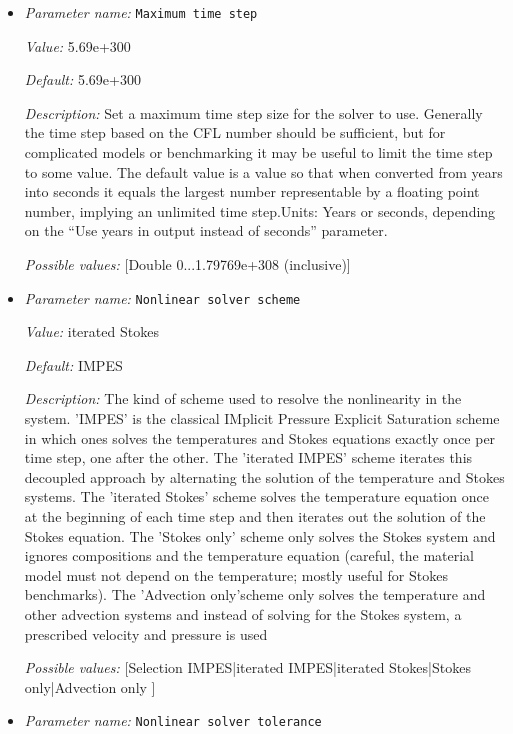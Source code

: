 \begin{itemize}
{\it Possible values:} [Integer range 0...2147483647 (inclusive)]
\item {\it Parameter name:} {\tt Maximum time step}
\label{parameters:Maximum time step}


{\it Value:} 5.69e+300


{\it Default:} 5.69e+300


{\it Description:} Set a maximum time step size for the solver to use. Generally the time step based on the CFL number should be sufficient, but for complicated models or benchmarking it may be useful to limit the time step to some value. The default value is a value so that when converted from years into seconds it equals the largest number representable by a floating point number, implying an unlimited time step.Units: Years or seconds, depending on the ``Use years in output instead of seconds'' parameter.


{\it Possible values:} [Double 0...1.79769e+308 (inclusive)]
\item {\it Parameter name:} {\tt Nonlinear solver scheme}
\label{parameters:Nonlinear solver scheme}


{\it Value:} iterated Stokes


{\it Default:} IMPES


{\it Description:} The kind of scheme used to resolve the nonlinearity in the system. 'IMPES' is the classical IMplicit Pressure Explicit Saturation scheme in which ones solves the temperatures and Stokes equations exactly once per time step, one after the other. The 'iterated IMPES' scheme iterates this decoupled approach by alternating the solution of the temperature and Stokes systems. The 'iterated Stokes' scheme solves the temperature equation once at the beginning of each time step and then iterates out the solution of the Stokes equation. The 'Stokes only' scheme only solves the Stokes system and ignores compositions and the temperature equation (careful, the material model must not depend on the temperature; mostly useful for Stokes benchmarks). The 'Advection only'scheme only solves the temperature and other advection systems and instead of solving for the Stokes system, a prescribed velocity and pressure is used


{\it Possible values:} [Selection IMPES|iterated IMPES|iterated Stokes|Stokes only|Advection only ]
\item {\it Parameter name:} {\tt Nonlinear solver tolerance}
\label{parameters:Nonlinear solver tolerance}



\end{itemize}
